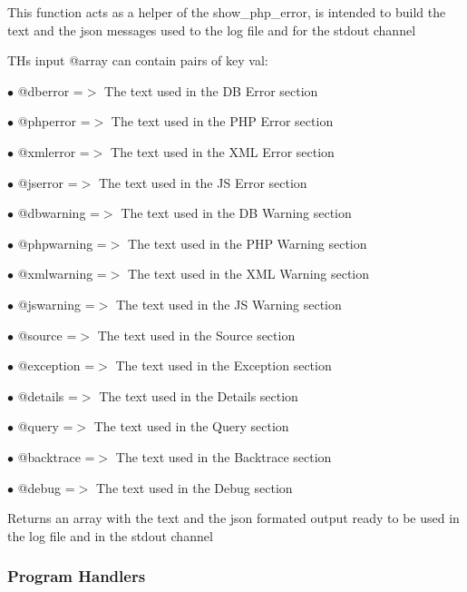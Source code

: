 \documentclass[a4paper]{article}
\begin{document}
This function acts as a helper of the show\_php\_error, is intended to build
the text and the json messages used to the log file and for the stdout channel

THs input @array can contain pairs of key val:

\begin{compactitem}
\item[\color{myblue}$\bullet$] @dberror    =$>$ The text used in the DB Error section
\item[\color{myblue}$\bullet$] @phperror   =$>$ The text used in the PHP Error section
\item[\color{myblue}$\bullet$] @xmlerror   =$>$ The text used in the XML Error section
\item[\color{myblue}$\bullet$] @jserror    =$>$ The text used in the JS Error section
\item[\color{myblue}$\bullet$] @dbwarning  =$>$ The text used in the DB Warning section
\item[\color{myblue}$\bullet$] @phpwarning =$>$ The text used in the PHP Warning section
\item[\color{myblue}$\bullet$] @xmlwarning =$>$ The text used in the XML Warning section
\item[\color{myblue}$\bullet$] @jswarning  =$>$ The text used in the JS Warning section
\item[\color{myblue}$\bullet$] @source     =$>$ The text used in the Source section
\item[\color{myblue}$\bullet$] @exception  =$>$ The text used in the Exception section
\item[\color{myblue}$\bullet$] @details    =$>$ The text used in the Details section
\item[\color{myblue}$\bullet$] @query      =$>$ The text used in the Query section
\item[\color{myblue}$\bullet$] @backtrace  =$>$ The text used in the Backtrace section
\item[\color{myblue}$\bullet$] @debug      =$>$ The text used in the Debug section
\end{compactitem}

Returns an array with the text and the json formated output ready to be used
in the log file and in the stdout channel

\hypertarget{toc113}{}
\subsubsection{Program Handlers}
\end{document}
